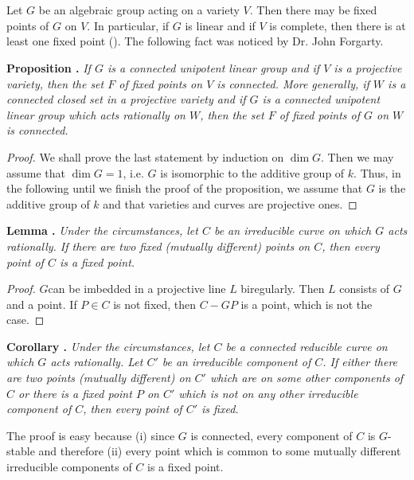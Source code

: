 \section{}\label{art16-sec3}
Let $G$ be an algebraic group acting on a variety $V$. Then there may be fixed points of $G$ on $V$. In particular, if $G$ is linear and if $V$ is complete, then there is at least one fixed point (\cite{art16-key-B}). The following fact was noticed by Dr. John Forgarty.

\medskip
\noindent
{\bf Proposition .\label{art16-prop3.1}}
{\em If $G$ is a connected unipotent linear group and if $V$ is a projective variety, then the set $F$ of fixed points on $V$ is connected. More generally, if $W$ is a connected closed set in a projective variety and if $G$ is a connected unipotent linear group which acts rationally on $W$, then the set $F$ of fixed points of $G$ on $W$ is connected.}

\begin{proof}
We shall prove the last statement by induction on $\dim G$. Then we may assume that $\dim G=1$, i.e. $G$ is isomorphic to the additive group of $k$. Thus, in the following until we finish the proof of the proposition, we assume that $G$ is the additive group of $k$ and that varieties and curves are projective ones.
\end{proof}

\medskip
\noindent
{\bf Lemma .\label{art16-lem3.2}}
{\em Under the circumstances, let $C$ be an irreducible curve on which $G$ acts rationally. If there are two fixed (mutually different) points on $C$, then every point of $C$ is a fixed point.}

\begin{proof}
$G$\pageoriginale can be imbedded in a projective line $L$ biregularly. Then $L$ consists of $G$ and a point. If $P\in C$ is not fixed, then $C-GP$ is a point, which is not the case.
\end{proof}

\medskip
\noindent
{\bf Corollary .\label{art16-coro3.3}}
{\em Under the circumstances, let $C$ be a connected reducible curve on which $G$ acts rationally. Let $C'$ be an irreducible component of $C$. If either there are two points (mutually different) on $C'$ which are on some other components of $C$ or there is a fixed point $P$ on $C'$ which is not on any other irreducible component of $C$, then every point of $C'$ is fixed.}

The proof is easy because (i) since $G$ is connected, every component of $C$ is $G$-stable and therefore (ii) every point which is common to some mutually different irreducible components of $C$ is a fixed point.

